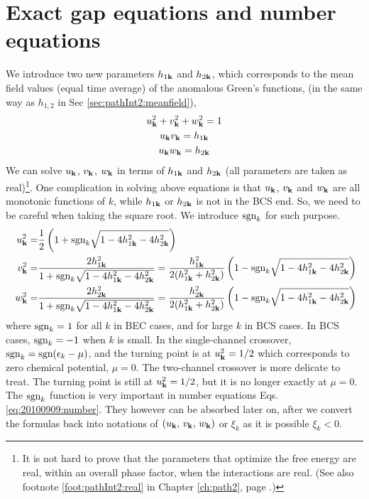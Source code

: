  \section{Exact gap equations and number equations}
We introduce two new parameters $h_{1\mathbf{k}}$ and $h_{2\mathbf{k}}$, which corresponds to the mean field values (equal time average) of the anomalous Green's functions,  (in the same way as  $h_{1,2}$  in Sec \ref{sec:pathInt2:meanfield}), 
\begin{gather}
u_{\mathbf{k}}^2+v^{2}_{\mathbf{k}}+w^{2}_{\mathbf{k}}=1\\
u_{\mathbf{k}}v_{\mathbf{k}}=h_{1\mathbf{k}}\\
u_{\mathbf{k}}w_{\mathbf{k}}=h_{2\mathbf{k}}
\end{gather}
We can solve $u_{\mathbf{k}}$, $v_{\mathbf{k}}$, $w_{\mathbf{k}}$ in terms of  $h_{1\mathbf{k}}$ and $h_{2\mathbf{k}}$ (all parameters are taken as real)\footnote{It is not hard to prove that the parameters that optimize the free energy are real, within an overall phase factor, when the interactions are real. (See also footnote \ref{foot:pathInt2:real} in Chapter \ref{ch:path2}, page \pageref{foot:pathInt2:real}.)}.  One complication in solving above equations is that $u_{\mathbf{k}}$, $v_{\mathbf{k}}$ and  $w_{\mathbf{k}}$ are all  monotonic functions of $k$, while $h_{1\mathbf{k}}$ or $h_{2\mathbf{k}}$ is not in the BCS end.  So, we need to be careful when taking the square root.  We introduce $\text{sgn}_k$ for such purpose.  
\begin{equation}\label{eq:uvw:uvwh12}
\begin{split}
u_{\mathbf{k}}^2=&\frac{1}{2} \left(1+\text{sgn}_{k}\sqrt{1-4 h_{1\mathbf{k}}^2-4 h_{2\mathbf{k}}^2}\right)\\
v^{2}_{\mathbf{k}}=&\frac{2 h_{1\mathbf{k}}^2}{1+\text{sgn}_{k}\sqrt{1-4 h_{1\mathbf{k}}^2-4 h_{2\mathbf{k}}^2}}
=\frac{ h_{1\mathbf{k}}^2}{2( h_{1\mathbf{k}}^2+ h_{2\mathbf{k}}^2)} \left(1-\text{sgn}_{k}\sqrt{1-4 h_{1\mathbf{k}}^2-4 h_{2\mathbf{k}}^2}\right)\\\
w^{2}_{\mathbf{k}}=&\frac{2 h_{2\mathbf{k}}^2}{1+\text{sgn}_{k}\sqrt{1-4 h_{1\mathbf{k}}^2-4 h_{2\mathbf{k}}^2}}
=\frac{h_{2\mathbf{k}}^2}{2( h_{1\mathbf{k}}^2+ h_{2\mathbf{k}}^2)} \left(1-\text{sgn}_{k}\sqrt{1-4 h_{1\mathbf{k}}^2-4 h_{2\mathbf{k}}^2}\right)
\end{split}
\end{equation}
  where $\text{sgn}_k=1$  for all $k$ in BEC cases, and  for large $k$ in BCS cases. In BCS cases,  $\text{sgn}_{k}=-1$ when $k$ is small.  In the single-channel crossover, $\text{sgn}_{k}=\text{sgn}(\epsilon_{k}-\mu)$, and the turning point is at $u_{\mathbf{k}}^2=1/2$ which corresponds to zero chemical potential, $\mu=0$.  The two-channel crossover is more delicate to treat.  The turning point is still at $u_{\mathbf{k}}^2=1/2$, but it is no longer exactly at $\mu=0$.  The $\text{sgn}_{k}$ function  is very important in number equations Eqs. \ref{eq:20100909:number}.  They however can be  absorbed later on, after we convert the formulas back into notations of  $(u_{\mathbf{k}},\,v_{\mathbf{k}}, \,w_{\mathbf{k}})$ or $\xi_{k}$ as it is possible $\xi_{k}<0$.


